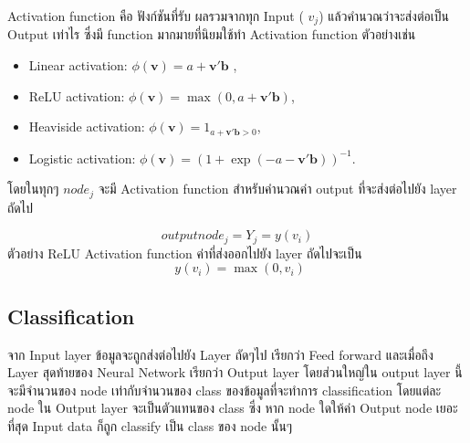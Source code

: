 Activation function \cite{Activation} คือ ฟังก์ชันที่รับ ผลรวมจากทุก Input ( $v_j $)  แล้วคำนวณว่าจะส่งต่อเป็น Output เท่าไร
ซึ่งมี function มากมายที่นิยมใช้ทำ Activation function ตัวอย่างเช่น
\begin{itemize}
  \item Linear activation:  ${\displaystyle \phi (\mathbf {v} )=a+\mathbf {v} '\mathbf {b} }$ ,
  \item ReLU activation: ${\displaystyle \phi (\mathbf {v} )=\max(0,a+\mathbf {v} '\mathbf {b} )}$,
  \item Heaviside activation: ${\displaystyle \phi (\mathbf {v} )=1_{a+\mathbf {v} '\mathbf {b} >0}}$,
  \item Logistic activation: ${\displaystyle \phi (\mathbf {v} )=(1+\exp(-a-\mathbf {v} '\mathbf {b} ))^{-1}}$.
\end{itemize} 

โดยในทุกๆ $node_j$ จะมี Activation function สำหรับคำนวณค่า output ที่จะส่งต่อไปยัง layer ถัดไป  

\begin{equation} output node_j =  Y_j =  y(v_i)  \end{equation}
ตัวอย่าง ReLU Activation function ค่าที่ส่งออกไปยัง layer ถัดไปจะเป็น
\begin{equation} ~~ y(v_i) = \max(0,v_i)   
  \end{equation}

\subsection{Classification}
จาก Input layer ข้อมูลจะถูกส่งต่อไปยัง Layer ถัดๆไป เรียกว่า Feed forward และเมื่อถึง
Layer สุดท้ายของ Neural Network เรียกว่า Output layer โดยส่วนใหญ่ใน output layer นี้จะมีจำนวนของ node เท่ากับจำนวนของ class ของข้อมูลที่จะทำการ classification 
โดยแต่ละ node ใน Output layer จะเป็นตัวแทนของ class ซึ่ง หาก node ใดให้ค่า Output node เยอะที่สุด Input data ก็ถูก classify เป็น class ของ node นั้นๆ


